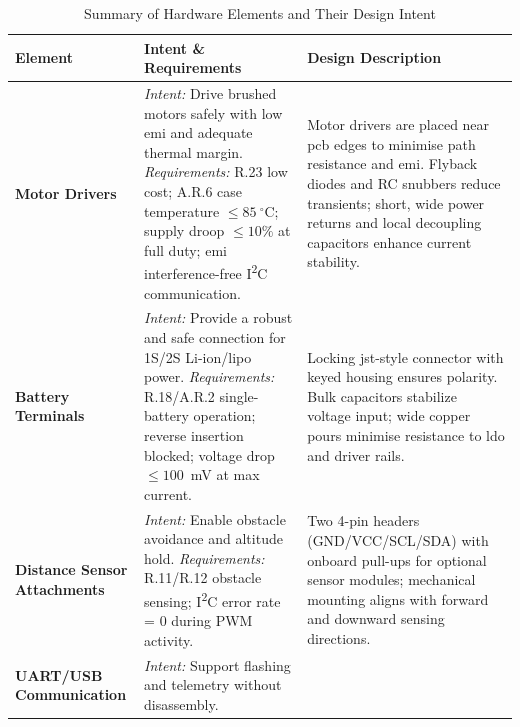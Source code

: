 \begin{longtable}{@{}p{2cm} p{6.9cm} p{6.9cm}@{}}
\caption{Summary of Hardware Elements and Their Design Intent}
\label{tab:hardware-elements} \\
\toprule
\textbf{Element} & \textbf{Intent \& Requirements} & \textbf{Design Description} \\ 
\midrule
\textbf{Motor Drivers} &
\textit{Intent:} Drive brushed motors safely with low \gls{emi} and adequate thermal margin. \newline
\textit{Requirements:} R.23 low cost; A.R.6 case temperature $\leq 85~^{\circ}$C; supply droop $\leq 10\%$ at full duty; \gls{emi} interference-free I\textsuperscript{2}C communication. &
Motor drivers are placed near \gls{pcb} edges to minimise path resistance and \gls{emi}. Flyback diodes and RC snubbers reduce transients; short, wide power returns and local decoupling capacitors enhance current stability. \\ 
\midrule
\textbf{Battery Terminals} &
\textit{Intent:} Provide a robust and safe connection for 1S/2S Li-ion/\gls{lipo} power. \newline
\textit{Requirements:} R.18/A.R.2 single-battery operation; reverse insertion blocked; voltage drop $\leq 100$~mV at max current. &
Locking \gls{jst}-style connector with keyed housing ensures polarity. Bulk capacitors stabilize voltage input; wide copper pours minimise resistance to \gls{ldo} and driver rails. \\ 
\midrule
\textbf{Distance Sensor Attachments} &
\textit{Intent:} Enable obstacle avoidance and altitude hold. \newline
\textit{Requirements:} R.11/R.12 obstacle sensing; I\textsuperscript{2}C error rate = 0 during PWM activity. &
Two 4-pin headers (GND/VCC/SCL/SDA) with onboard pull-ups for optional sensor modules; mechanical mounting aligns with forward and downward sensing directions. \\ 
\midrule
\textbf{UART/USB Communication} &
\textit{Intent:} Support flashing and telemetry without disassembly. \newline

\end{longtable}

